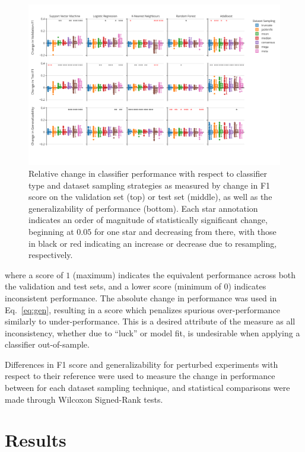 \documentclass[10pt]{SelfArx} %
\begin{document}
\begin{figure}[bth!]\centering
\includegraphics[width=\linewidth]{figures/1.pdf}
\caption{Relative change in classifier performance with respect to classifier type and dataset sampling strategies as
measured by change in F1 score on the validation set (top) or test set (middle), as well as the generalizability of
performance (bottom). Each star annotation indicates an order of magnitude of statistically significant change,
beginning at $0.05$ for one star and decreasing from there, with those in black or red indicating an increase or
decrease due to resampling, respectively.}
\label{fig:overall_perf}
\end{figure}

where a score of $1$ (maximum) indicates the equivalent performance across both the validation and test sets, and a
lower score (minimum of $0$) indicates inconsistent performance. The absolute change in performance was used in
Eq.~\ref{eq:gen}, resulting in a score which penalizes spurious over-performance similarly to under-performance. This
is a desired attribute of the measure as all inconsistency, whether due to ``luck'' or model fit, is undesirable when
applying a classifier out-of-sample.

Differences in F1 score and generalizability for perturbed experiments with respect to their reference were used to
measure the change in performance between for each dataset sampling technique, and statistical comparisons were made
through Wilcoxon Signed-Rank tests.


\section*{Results}
\end{document}
